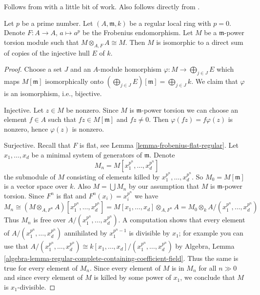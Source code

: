\begin{lemma}
\label{lemma-structure-torsion-Frobenius-regular}
\begin{reference}
Follows from \cite[Corollary 3.6]{Huneke-Sharp} with a
little bit of work. Also follows directly from
\cite[Theorem 1.4]{Lyubeznik2}.
\end{reference}
Let $p$ be a prime number. Let $(A, \mathfrak m, k)$
be a regular local ring with $p = 0$. Denote $F : A \to A$, $a \mapsto a^p$
be the Frobenius endomorphism. Let $M$ be a $\mathfrak m$-power torsion module
such that $M \otimes_{A, F} A \cong M$. Then $M$ is isomorphic to a direct sum
of copies of the injective hull $E$ of $k$.
\end{lemma}

\begin{proof}
Choose a set $J$ and an $A$-module homorphism
$\varphi : M \to \bigoplus_{j \in J} E$ which maps
$M[\mathfrak m]$ isomorphically onto
$(\bigoplus_{j \in J} E)[\mathfrak m] = \bigoplus_{j \in J} k$.
We claim that $\varphi$ is an isomorphism, i.e., bijective.

\medskip\noindent
Injective. Let $z \in M$ be nonzero. Since $M$ is $\mathfrak m$-power torsion
we can choose an element $f \in A$ such that $fz \in M[\mathfrak m]$ and
$fz \not = 0$. Then $\varphi(fz) = f\varphi(z)$ is nonzero, hence
$\varphi(z)$ is nonzero.

\medskip\noindent
Surjective. Recall that $F$ is flat, see
Lemma \ref{lemma-frobenius-flat-regular}.
Let $x_1, \ldots, x_d$ be a minimal system of generators of
$\mathfrak m$. Denote
$$
M_n = M[x_1^{p^n}, \ldots, x_d^{p^n}]
$$
the submodule of $M$ consisting of elements killed by
$x_1^{p^n}, \ldots, x_d^{p^n}$. So $M_0 = M[\mathfrak m]$
is a vector space over $k$. Also $M = \bigcup M_n$ by our
assumption that $M$ is $\mathfrak m$-power torsion. Since $F^n$ is flat and
$F^n(x_i) = x_i^{p^n}$ we have
$$
M_n \cong (M \otimes_{A, F^n} A)[x_1^{p^n}, \ldots, x_d^{p^n}] =
M[x_1, \ldots, x_d] \otimes_{A, F^n} A =
M_0 \otimes_k A/(x_1^{p^n}, \ldots, x_d^{p^n})
$$
Thus $M_n$ is free over $A/(x_1^{p^n}, \ldots, x_d^{p^n})$.
A computation shows that every element of $A/(x_1^{p^n}, \ldots, x_d^{p^n})$
annihilated by $x_1^{p^n - 1}$ is divisible by $x_1$; for example
you can use that $A/(x_1^{p^n}, \ldots, x_d^{p^n}) \cong
k[x_1, \ldots, x_d]/(x_1^{p^n}, \ldots, x_d^{p^n})$ by Algebra, Lemma
\ref{algebra-lemma-regular-complete-containing-coefficient-field}.
Thus the same is true for every element of $M_n$.
Since every element of $M$ is in $M_n$ for all $n \gg 0$
and since every element of $M$ is killed by some power of
$x_1$, we conclude that $M$ is $x_1$-divisible.


\end{proof}

